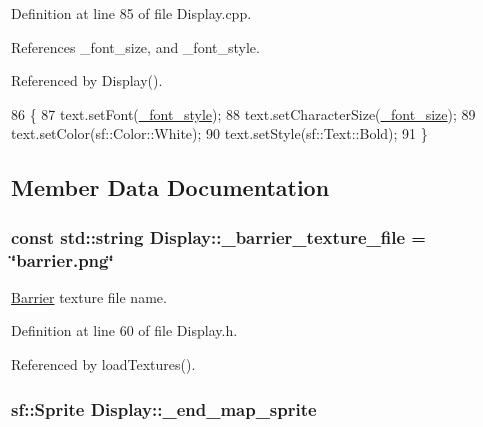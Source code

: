 Definition at line 85 of file Display.\-cpp.



References \-\_\-font\-\_\-size, and \-\_\-font\-\_\-style.



Referenced by Display().


\begin{DoxyCode}
86 \{
87     text.setFont(\hyperlink{classDisplay_a937e4b846d090d1d520e15d6233bbfc0}{\_font\_style});
88     text.setCharacterSize(\hyperlink{classDisplay_ae10066fc5854e77ea65d3a64912b079a}{\_font\_size});
89     text.setColor(sf::Color::White);
90     text.setStyle(sf::Text::Bold);
91 \}
\end{DoxyCode}


\subsection{Member Data Documentation}
\hypertarget{classDisplay_af921ed4131e5d5763e76ea7c54c3fea8}{
\subsubsection[{\-\_\-barrier\-\_\-texture\-\_\-file}]{\setlength{\rightskip}{0pt plus 5cm}const std\-::string Display\-::\-\_\-barrier\-\_\-texture\-\_\-file = \char`\"{}barrier.\-png\char`\"{}\hspace{0.3cm}{\ttfamily [private]}}}\label{classDisplay_af921ed4131e5d5763e76ea7c54c3fea8}


\hyperlink{classBarrier}{Barrier} texture file name. 



Definition at line 60 of file Display.\-h.



Referenced by load\-Textures().

\hypertarget{classDisplay_a3bcec98cfc7e32f4fb46e625d76984a0}{
\subsubsection[{\-\_\-end\-\_\-map\-\_\-sprite}]{\setlength{\rightskip}{0pt plus 5cm}sf\-::\-Sprite Display\-::\-\_\-end\-\_\-map\-\_\-sprite\hspace{0.3cm}{\ttfamily [private]}}}\label{classDisplay_a3bcec98cfc7e32f4fb46e625d76984a0}


